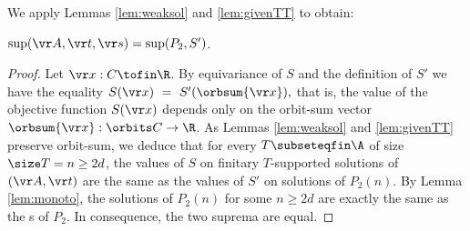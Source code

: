 %
%
We apply Lemmas \ref{lem:weaksol} and \ref{lem:givenTT}
to obtain:
%
\begin{lemma}  \label{lem:givenTobj}
$\sup (\vr A, \vr t, \vr s) = \sup (P_2, S')$.
\end{lemma}
%
\begin{proof}%
Let $\vr x : C\tofin\R$. By equivariance of $S$ and the definition of $S'$ we have the equality
$
S(\vr x) \ = \ S'(\orbsum{\vr x}),
$
that is,
the value of the objective function $S(\vr x)$ depends only on the orbit-sum vector 
$\orbsum{\vr x} : \orbits C \to \R$.
As Lemmas \ref{lem:weaksol} and \ref{lem:givenTT} preserve orbit-sum, we deduce that
for every $T\subseteqfin\A$ of size $\size T =n \geq 2d$,
the values of $S$ on finitary $T$-supported solutions of $(\vr A, \vr t)$ are the same as
the values of $S'$ on solutions of $P_2(n)$.
By Lemma \ref{lem:monoto}, the solutions of $P_2(n)$ for some $n\geq 2d$ are exactly the same as
the {\aasol}s of $P_2$.
In consequence, the two suprema are equal.
%
%
%
%
\end{proof}
